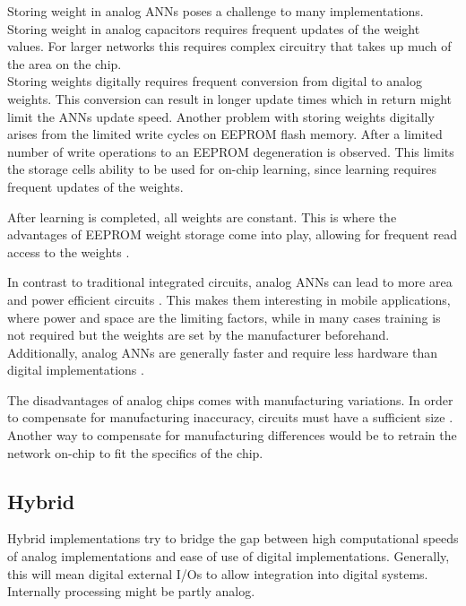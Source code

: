 \documentclass[conference]{IEEEtran}
\begin{document}
    Storing weight in analog ANNs poses a challenge to many implementations.
    Storing weight in analog capacitors requires frequent updates of the weight values.
    For larger networks this requires complex circuitry that takes up much of the area on the chip.
    \\
    Storing weights digitally requires frequent conversion from digital to analog weights.
    This conversion can result in longer update times which in return might limit the ANNs update speed.
    Another problem with storing weights digitally arises from the limited write cycles on EEPROM flash memory.
    After a limited number of write operations to an EEPROM degeneration is observed.
    This limits the storage cells ability to be used for on-chip learning, since learning requires frequent updates of the weights.

    After learning is completed, all weights are constant.
    This is where the advantages of EEPROM weight storage come into play, allowing for frequent read access to the weights \cite{holler1989electrically}.


    In contrast to traditional integrated circuits, analog ANNs can lead to more area and power efficient circuits \cite{forssell2014hardware}.
    This makes them interesting in mobile applications, where power and space are the limiting factors, while in many cases training is not required but the weights are set by the manufacturer beforehand.
    Additionally, analog ANNs are generally faster and require less hardware than digital implementations \cite{hollis1990artificial}.

    The disadvantages of analog chips comes with manufacturing variations.
    In order to compensate for manufacturing inaccuracy, circuits must have a sufficient size \cite{forssell2014hardware}.
    Another way to compensate for manufacturing differences would be to retrain the network on-chip to fit the specifics of the chip.

    \subsection{Hybrid}

    Hybrid implementations try to bridge the gap between high computational speeds of analog implementations and ease of use of digital implementations.
    Generally, this will mean digital external I/Os to allow integration into digital systems.
    Internally processing might be partly analog.
\end{document}
